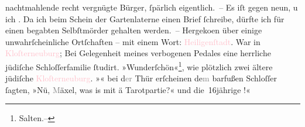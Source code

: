                nachtmahlende recht vergnügte Bürger, ſpärlich eigentlich. – Es iſt gegen
                  neun, u ich \label{K_L02960-2v}\label{K_L02960-2h}. Da ich beim Schein der Gartenlaterne {\pb}einen Brief ſchreibe, dürfte ich für einen
               begabten Selbſtmörder gehalten werden. – Hergeko{\geminationm}en über
               einige unwahrſcheinliche Ortſchaften – mit einem Wort: \textcolor{pink}{Heiligenſtadt}{}\ledrightnote{\textcolor{pink}{Heiligenstadt}}. War in \textcolor{pink}{Kloſterneuburg}{}\ledrightnote{\textcolor{pink}{Klosterneuburg}};
               Bei Gelegenheit meines verbogenen Pedales eine herrliche jüdiſche Schloſſerfamilie
                  {\pb}ſtudirt. »Wunderſchön«\footnote{\noindent{}Salten.–}, wie plötzlich zwei ältere jüdiſche \textcolor{pink}{Kloſterneuburg}{}\ledrightnote{\textcolor{pink}{Klosterneuburg}}. »\label{K_L02960-3v}\label{K_L02960-3h}« bei
                  d\textcolor{gray}{er} Thür erſcheinen {\kaufmannsund}
                  de\textcolor{gray}{m}
               barfußen Schloſſer ſagten, »Nü,
                  \textcolor{gray}{M}äxel, was is mit ä Tarotpartie?« und die 16jährige \label{K_L02960-4v}\label{K_L02960-4h}!«\pend
           
